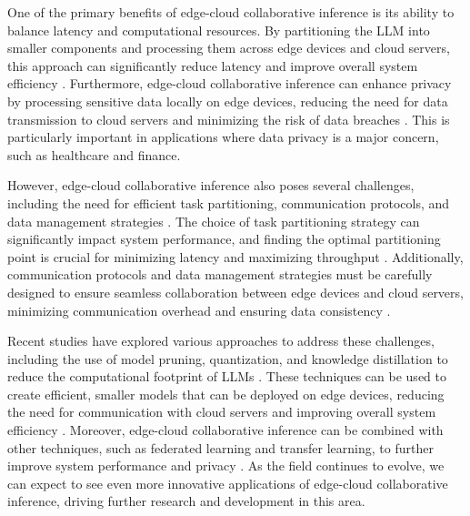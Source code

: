 \documentclass[11pt,a4paper]{article}
\begin{document}
One of the primary benefits of edge-cloud collaborative inference is its ability to balance latency and computational resources. By partitioning the LLM into smaller components and processing them across edge devices and cloud servers, this approach can significantly reduce latency and improve overall system efficiency \cite{doi:10.1109/twc.2022.3165824}. Furthermore, edge-cloud collaborative inference can enhance privacy by processing sensitive data locally on edge devices, reducing the need for data transmission to cloud servers and minimizing the risk of data breaches \cite{doi:10.1109/compsac61105.2024.00206}. This is particularly important in applications where data privacy is a major concern, such as healthcare and finance.

However, edge-cloud collaborative inference also poses several challenges, including the need for efficient task partitioning, communication protocols, and data management strategies \cite{doi:10.3390/electronics12173598}. The choice of task partitioning strategy can significantly impact system performance, and finding the optimal partitioning point is crucial for minimizing latency and maximizing throughput \cite{arxiv:2406.02616}. Additionally, communication protocols and data management strategies must be carefully designed to ensure seamless collaboration between edge devices and cloud servers, minimizing communication overhead and ensuring data consistency \cite{doi:10.1109/access.2024.3351308}.

Recent studies have explored various approaches to address these challenges, including the use of model pruning, quantization, and knowledge distillation to reduce the computational footprint of LLMs \cite{doi:10.1145/3744244}. These techniques can be used to create efficient, smaller models that can be deployed on edge devices, reducing the need for communication with cloud servers and improving overall system efficiency \cite{doi:10.1109/icmla58977.2023.00104}. Moreover, edge-cloud collaborative inference can be combined with other techniques, such as federated learning and transfer learning, to further improve system performance and privacy \cite{doi:10.1145/3690624.3709335}. As the field continues to evolve, we can expect to see even more innovative applications of edge-cloud collaborative inference, driving further research and development in this area.
\end{document}
